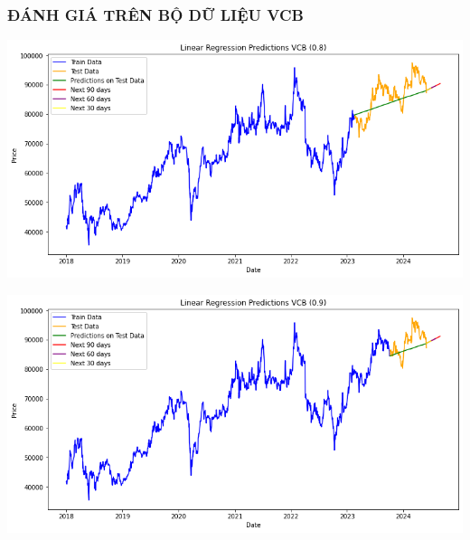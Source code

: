 \documentclass[conference]{IEEEtran}
\begin{document}
\subsubsection{ĐÁNH GIÁ TRÊN BỘ DỮ LIỆU VCB}
\begin{minipage}{0.21\textwidth}
    \centering
    \includegraphics[width=\linewidth]{images/LR/LR_VCB_82.png}
    \label{fig:image1}
\end{minipage}
\hfill
\begin{minipage}{0.21\textwidth}
    \centering
    \includegraphics[width=\linewidth]{images/LR/LR_VCB_91.png}
    \label{fig:image2}
\end{minipage}
\end{document}
